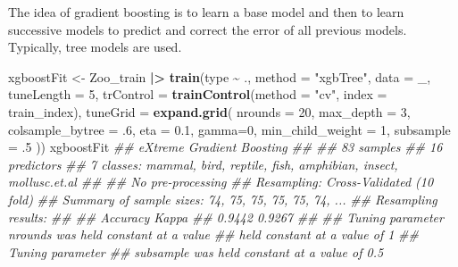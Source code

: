 \documentclass[
  notitlepage]{book}
\newenvironment{Shaded}{\begin{snugshade}}{\end{snugshade}}
\newcommand{\CommentTok}[1]{\textcolor[rgb]{0.56,0.35,0.01}{\textit{#1}}}
\newcommand{\DataTypeTok}[1]{\textcolor[rgb]{0.13,0.29,0.53}{#1}}
\newcommand{\DecValTok}[1]{\textcolor[rgb]{0.00,0.00,0.81}{#1}}
\newcommand{\ErrorTok}[1]{\textcolor[rgb]{0.64,0.00,0.00}{\textbf{#1}}}
\newcommand{\FloatTok}[1]{\textcolor[rgb]{0.00,0.00,0.81}{#1}}
\newcommand{\KeywordTok}[1]{\textcolor[rgb]{0.13,0.29,0.53}{\textbf{#1}}}
\newcommand{\NormalTok}[1]{#1}
\newcommand{\OperatorTok}[1]{\textcolor[rgb]{0.81,0.36,0.00}{\textbf{#1}}}
\newcommand{\StringTok}[1]{\textcolor[rgb]{0.31,0.60,0.02}{#1}}
\begin{document}
The idea of gradient boosting is to learn a base model and then to learn
successive models to predict and correct the error of all previous models.
Typically, tree models are used.

\begin{Shaded}
\begin{Highlighting}[]
\NormalTok{xgboostFit \textless{}{-}}\StringTok{ }\NormalTok{Zoo\_train }\OperatorTok{|}\ErrorTok{\textgreater{}}\StringTok{ }\KeywordTok{train}\NormalTok{(type }\OperatorTok{\textasciitilde{}}\StringTok{ }\NormalTok{.,}
  \DataTypeTok{method =} \StringTok{"xgbTree"}\NormalTok{,}
  \DataTypeTok{data =}\NormalTok{ \_,}
  \DataTypeTok{tuneLength =} \DecValTok{5}\NormalTok{,}
  \DataTypeTok{trControl =} \KeywordTok{trainControl}\NormalTok{(}\DataTypeTok{method =} \StringTok{"cv"}\NormalTok{, }
                           \DataTypeTok{index =}\NormalTok{ train\_index),}
  \DataTypeTok{tuneGrid =} \KeywordTok{expand.grid}\NormalTok{(}
    \DataTypeTok{nrounds =} \DecValTok{20}\NormalTok{,}
    \DataTypeTok{max\_depth =} \DecValTok{3}\NormalTok{,}
    \DataTypeTok{colsample\_bytree =} \FloatTok{.6}\NormalTok{,}
    \DataTypeTok{eta =} \FloatTok{0.1}\NormalTok{,}
    \DataTypeTok{gamma=}\DecValTok{0}\NormalTok{,}
    \DataTypeTok{min\_child\_weight =} \DecValTok{1}\NormalTok{,}
    \DataTypeTok{subsample =} \FloatTok{.5}
\NormalTok{  ))}
\NormalTok{xgboostFit}
\CommentTok{\#\# eXtreme Gradient Boosting }
\CommentTok{\#\# }
\CommentTok{\#\# 83 samples}
\CommentTok{\#\# 16 predictors}
\CommentTok{\#\#  7 classes: \textquotesingle{}mammal\textquotesingle{}, \textquotesingle{}bird\textquotesingle{}, \textquotesingle{}reptile\textquotesingle{}, \textquotesingle{}fish\textquotesingle{}, \textquotesingle{}amphibian\textquotesingle{}, \textquotesingle{}insect\textquotesingle{}, \textquotesingle{}mollusc.et.al\textquotesingle{} }
\CommentTok{\#\# }
\CommentTok{\#\# No pre{-}processing}
\CommentTok{\#\# Resampling: Cross{-}Validated (10 fold) }
\CommentTok{\#\# Summary of sample sizes: 74, 75, 75, 75, 75, 74, ... }
\CommentTok{\#\# Resampling results:}
\CommentTok{\#\# }
\CommentTok{\#\#   Accuracy  Kappa }
\CommentTok{\#\#   0.9442    0.9267}
\CommentTok{\#\# }
\CommentTok{\#\# Tuning parameter \textquotesingle{}nrounds\textquotesingle{} was held constant at a value}
\CommentTok{\#\#  held constant at a value of 1}
\CommentTok{\#\# Tuning parameter}
\CommentTok{\#\#  \textquotesingle{}subsample\textquotesingle{} was held constant at a value of 0.5}
\end{Highlighting}
\end{Shaded}
\end{document}
